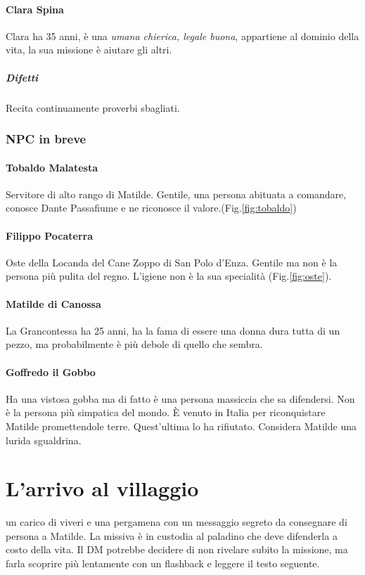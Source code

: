 \documentclass[letterpaper,twocolumn,openany,nodeprecatedcode]{dndbook}
\begin{document}
\subsubsection{Clara Spina}
Clara ha 35 anni, è una \textit{umana chierica, legale buona}, appartiene al dominio della vita, la sua missione è aiutare gli altri.
\paragraph{Difetti} Recita continuamente proverbi sbagliati.






\subsection{NPC in breve}

\subsubsection{Tobaldo Malatesta}
Servitore di alto rango di Matilde. Gentile, una persona abituata a comandare, conosce Dante Passafiume e ne riconosce il valore.(Fig.\ref{fig:tobaldo})

\subsubsection{Filippo Pocaterra}
Oste della Locanda del Cane Zoppo di San Polo d'Enza. Gentile ma non è la persona più pulita del regno. L'igiene non è la sua specialità (Fig.\ref{fig:oste}).

\subsubsection{Matilde di Canossa}
La Grancontessa ha 25 anni, ha la fama di essere una donna dura tutta di un pezzo, ma probabilmente è più debole di quello che sembra.

\subsubsection{Goffredo il Gobbo}
Ha una vistosa gobba ma di fatto è una persona massiccia che sa difendersi. Non è la persona più simpatica del mondo. È venuto in Italia per riconquistare Matilde promettendole terre. Quest'ultima lo ha rifiutato. Considera Matilde una lurida sgualdrina.


\chapter{L'arrivo al villaggio}
 un carico di viveri e una pergamena con un messaggio segreto da consegnare di persona a Matilde. La missiva è in custodia al paladino che deve difenderla a costo della vita. Il DM potrebbe decidere di non rivelare subito la missione, ma farla scoprire più lentamente con un flashback e leggere il testo seguente.
\end{document}
